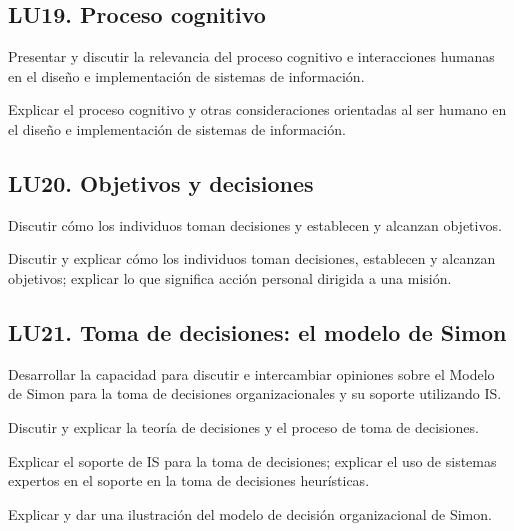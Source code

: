 \subsection{LU19. Proceso cognitivo}\label{sec:BOK-LU19}\label{sec:LU19}
\begin{LearningUnit}
\begin{LUGoal}
\item Presentar y discutir la relevancia del proceso cognitivo e interacciones humanas en el diseño e implementación de sistemas de información.
\end{LUGoal}

\begin{LUObjective}
\item Explicar el proceso cognitivo y otras consideraciones orientadas al ser humano en el diseño e implementación de sistemas de información.
\end{LUObjective}
\end{LearningUnit}

\subsection{LU20. Objetivos y decisiones}\label{sec:BOK-LU20}\label{sec:LU20}
\begin{LearningUnit}
\begin{LUGoal}
\item Discutir cómo los individuos toman decisiones y establecen y alcanzan objetivos.
\end{LUGoal}

\begin{LUObjective}
\item Discutir y explicar cómo los individuos toman decisiones, establecen y alcanzan objetivos; explicar lo que significa acción personal dirigida a una misión.
\end{LUObjective}
\end{LearningUnit}

\subsection{LU21. Toma de decisiones: el modelo de Simon}\label{sec:BOK-LU21}\label{sec:LU21}
\begin{LearningUnit}
\begin{LUGoal}
\item Desarrollar la capacidad para discutir e intercambiar opiniones sobre  el Modelo de Simon para la toma de decisiones organizacionales y su soporte utilizando IS.
\end{LUGoal}

\begin{LUObjective}
\item Discutir y explicar la teoría de decisiones y el proceso de toma de decisiones.
\item Explicar el soporte de IS para la toma de decisiones; explicar el uso de sistemas expertos en el soporte en la toma de decisiones heurísticas.
\item Explicar y dar una ilustración del modelo de decisión organizacional de Simon.
\end{LUObjective}
\end{LearningUnit}


